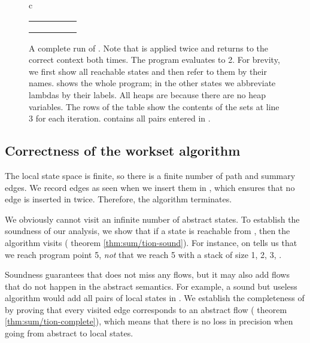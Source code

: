 \documentclass{LMCS}
\theoremstyle{definition} \newtheorem{property}[thm]{Property}
\begin{document}
\begin{figure}[!t]
{\begin{tabular*}{\textwidth}{c}
\begin{tabular}{|@{} c @{} | @{} c @{} | @{} c @{} | @{} c @{} | @{} c @{}|}
    \\
    \hline
     &
     & 
     &
     &
    \mtset \rule{0cm}{0.45cm} 
    \\
    \hline
     &
     & 
     &
     &
    \mtset \rule{0cm}{0.45cm} 
    \\
    \hline
     &
     & 
     &
     &
    \mtset \rule{0cm}{0.45cm} 
    \\
    \hline
    \mtset &
     & 
     &
     &
    \statnum{8} \rule{0cm}{0.45cm} 
    \\
    \hline
  \end{tabular}
\end{tabular*}
}
\caption{A complete run of \cfat{}. 
  Note that  is applied twice and returns to the correct context both 
  times. 
  The program evaluates to 2.
  For brevity, we first show all reachable states and then refer to them by 
  their names.
  \linitstate{} shows the whole program; in the other states we abbreviate
  lambdas by their labels.
  All heaps are  because there are no heap variables.
  The rows of the table show the contents of the sets at line 3 for each
  iteration.
  \seen{} contains all pairs entered in \work{}.
  \label{fig:cfa2-eg}}
\end{figure}

\subsection{Correctness of the workset algorithm}

The local state space is finite, so there is a finite number of path and 
summary edges.
We record edges as seen when we insert them in \work{},
which ensures that no edge is inserted in \work{} twice.
Therefore, the algorithm terminates.

We obviously cannot visit an infinite number of abstract states.
To establish the soundness of our analysis, we show that if a state \astat{} is
reachable from \ainitstate, then the algorithm visits \atol{\astat} 
(\confer{} theorem \ref{thm:sum/tion-sound}). 
For instance, \cfat{} on  tells us that we reach program point 5, 
\emph{not} that we reach 5 with a stack of size 1, 2, 3, \etc.

Soundness guarantees that \cfat{} does not miss any flows,
but it may also add flows that do not happen in the abstract semantics.
For example, a sound but useless algorithm would add all pairs of local states 
in \seen{}.
We establish the completeness of \cfat{} by proving that every visited
edge corresponds to an abstract flow (\confer{} theorem 
\ref{thm:sum/tion-complete}), which means that there is no loss in precision 
when going from abstract to local states.
\end{document}
